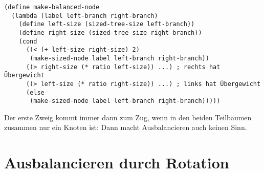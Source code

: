 \begin{lstlisting}
(define make-balanced-node
  (lambda (label left-branch right-branch)
    (define left-size (sized-tree-size left-branch))
    (define right-size (sized-tree-size right-branch))
    (cond
      ((< (+ left-size right-size) 2)
       (make-sized-node label left-branch right-branch))
      ((> right-size (* ratio left-size)) ...) ; rechts hat Übergewicht
      ((> left-size (* ratio right-size)) ...) ; links hat Übergewicht
      (else
       (make-sized-node label left-branch right-branch)))))
\end{lstlisting}
%
Der erste Zweig kommt immer dann zum Zug, wenn in den beiden
Teilbäumen zusammen nur ein Knoten ist: Dann macht Ausbalancieren auch
keinen Sinn.

\section{Ausbalancieren durch Rotation}

